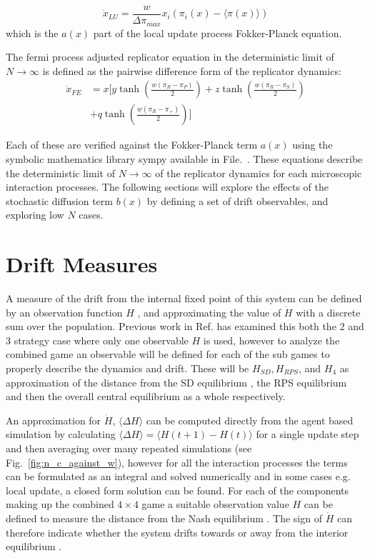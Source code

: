 \documentclass[%
 reprint,
 amsmath,amssymb,
 aps,
]{revtex4-2}
\begin{document}
\begin{equation}
\dot{x}_{LU} = \frac{w}{\Delta \pi_{max}}x_i(\pi_i(x) - \langle \pi(x) \rangle)
\end{equation}
which is the $a(x)$ part of the local update process Fokker-Planck equation.


The fermi process adjusted replicator equation in the deterministic limit 
of $N \rightarrow \infty$ is defined as the pairwise difference form of the 
replicator dynamics:
\begin{align}
\dot{x}_{FE} &= x \Big[
    y \tanh\!\left(\frac{w(\pi_R - \pi_P)}{2}\right)
  + z \tanh\!\left(\frac{w(\pi_R - \pi_S)}{2}\right)\nonumber \\
  &+ q \tanh\!\left(\frac{w(\pi_R - \pi_+)}{2}\right)
\Big]
\end{align}

Each of these are verified against the Fokker-Planck term $a(x)$ using the symbolic mathematics library sympy available in 
File.~\cite{aug_rps}. These equations describe the deterministic limit of $N \rightarrow \infty$ of the replicator
dynamics
for each microscopic interaction processes.
The following sections will explore the effects of the stochastic diffusion term $b(x)$ by defining a set of 
drift observables, and exploring low $N$ cases.



\section{\label{sec:drift_measures}Drift Measures}

A measure of the drift from the internal fixed point of this system can be defined by
an observation function $H$ \cite{Claussen2007-zo,drift_reversal_paper,rps_cyclic_jens}, and 
approximating the value of $\dot{H}$ with a discrete sum over the population.
Previous work in Ref. \cite{Claussen2007-zo,drift_reversal_paper,rps_cyclic_jens} has
examined this both the 2 and 3 strategy case where only one observable $H$ is used, however
to analyze the combined game an observable will be defined for each of the sub games to 
properly describe the dynamics and drift. These will be $H_{SD}, H_{RPS}$, and $H_4$ 
as approximation of the distance from the SD equilibrium , the RPS equilibrium and then the 
overall central equilibrium as a whole respectively.

An approximation for $\dot{H}$, $\langle \Delta H \rangle$ can be computed directly from the 
agent based simulation by calculating $\langle \Delta H \rangle = \langle H(t+1) - H(t) \rangle$ 
for a single update step and then averaging over many repeated simulations (see Fig.~\ref{fig:n_c_against_w}), 
however for all the interaction processes the terms can be 
formulated as an integral and solved numerically and in some cases e.g. local update, a 
closed form solution can be found.
For each of the components making up the combined $4 \times 4$ game a suitable observation
value $H$ can be defined to measure the distance from the Nash equilibrium 
\cite{drift_reversal_paper,rps_cyclic_jens}. The sign of $\dot{H}$ can therefore
indicate whether the system drifts towards or away from the interior equilibrium \cite{drift_reversal_paper}.
\end{document}
